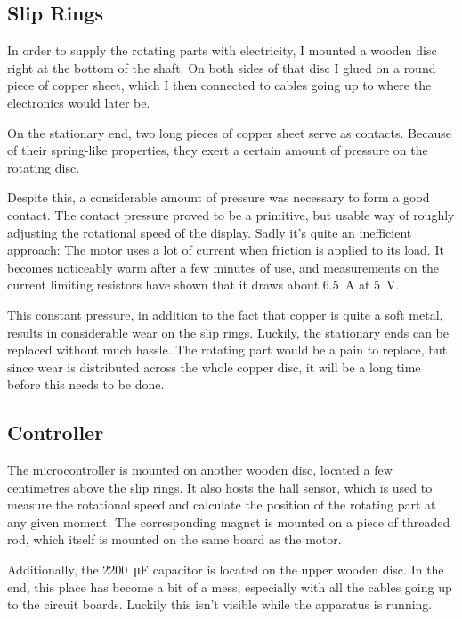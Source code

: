 \documentclass[a4paper, 11pt, titlepage]{report}
\begin{document}
\subsection{Slip Rings}

In order to supply the rotating parts with electricity, I mounted a wooden disc right at the
bottom of the shaft. On both sides of that disc I glued on a round piece of copper sheet, which I
then connected to cables going up to where the electronics would later be.

On the stationary end, two long pieces of copper sheet serve as contacts. Because of their
spring-like properties, they exert a certain amount of pressure on the rotating disc.

Despite this, a considerable amount of pressure was necessary to form a good contact. The contact
pressure proved to be a primitive, but usable way of roughly adjusting the rotational speed of
the display. Sadly it's quite an inefficient approach: The motor uses a lot of current when
friction is applied to its load. It becomes noticeably warm after a few minutes of use, and
measurements on the current limiting resistors have shown that it draws about \SI{6.5}{\ampere} at
\SI{5}{\volt}.

This constant pressure, in addition to the fact that copper is quite a soft metal, results in
considerable wear on the slip rings. Luckily, the stationary ends can be replaced without much
hassle. The rotating part would be a pain to replace, but since wear is distributed across the
whole copper disc, it will be a long time before this needs to be done.


\subsection{Controller}

The microcontroller is mounted on another wooden disc, located a few centimetres above the slip
rings. It also hosts the hall sensor, which is used to measure the rotational speed and calculate
the position of the rotating part at any given moment. The corresponding magnet is mounted on a
piece of threaded rod, which itself is mounted on the same board as the motor.

Additionally, the \SI{2200}{\micro\farad} capacitor is located on the upper wooden disc. In the
end, this place has become a bit of a mess, especially with all the cables going up to the circuit
boards. Luckily this isn't visible while the apparatus is running.
\end{document}
